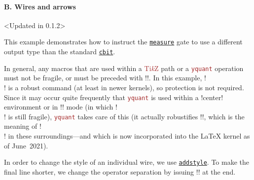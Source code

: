 \documentclass{scrartcl}
\makeatletter
\newenvironment{codeexample*}{%
   \VerbatimEnvironment%
   \let\FVB@VerbatimOut\minted@FVB@VerbatimOut
   \let\FVE@VerbatimOut\minted@FVE@VerbatimOut
   \minted@configlang{tex}%
   \minted@fvset
   \begin{VerbatimOut}[codes={\catcode`\^^I=12},firstline,lastline]{\minted@jobname.pyg}%
}{
   \end{VerbatimOut}%
   \minted@langlinenoson%
   \begin{adjustbox}{center}
       \minted@jobname.pyg %
   \end{adjustbox}\nopagebreak
   \minted@pygmentize{\minted@lang}%
   \minted@langlinenosoff%
   \par%
}
\def\TikZ{\textcolor{brown}{Ti\textit kZ}}
\def\pkg#1{\textcolor{brown}{\texttt{#1}}}
\def\gate#1{\hyperref[gate:#1]{\texttt{#1}}}
\def\Yquant{\pkg{yquant}}
\makeatother
\begin{document}
            \paragraph{B. Wires and arrows}\leavevmode
               \begin{example}<Updated in 0.1.2>
                  \begin{codeexample*}
                  \end{codeexample*}
                  This example demonstrates how to instruct the \gate{measure} gate to use a different output type than the standard \gate{cbit}.

                  In general, any macros that are used within a \TikZ{} path or a \Yquant{} operation must not be fragile, or must be preceded with \tex!\protect!.
                  In this example, \tex!\\! is a robust command (at least in newer kernels), so protection is not required.
                  Since it may occur quite frequently that \Yquant{} is used within a \tex!center! environment or in \tex!\centering! mode (in which \tex!\\! is still fragile), \Yquant{} takes care of this (it actually robustifies \tex!\@centercr!, which is the meaning of \tex!\\! in these surroundings---and which is now incorporated into the \LaTeX{} kernel as of June~2021).

                  In order to change the style of an individual wire, we use \gate{addstyle}.
                  To make the final line shorter, we change the operator separation by issuing \tex!\yquantset! at the end.
               \end{example}
\end{document}
